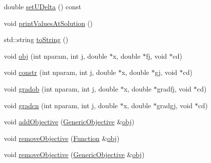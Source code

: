 \begin{DoxyCompactItemize}
double \hyperlink{classocra_1_1FSQPSolver_abcf60aed58c92261f4766a1718b9d10a}{set\+U\+Delta} () const 
\item 
void \hyperlink{classocra_1_1FSQPSolver_ad41514dc166b19fca4812b5521777f0a}{print\+Values\+At\+Solution} ()
\item 
std\+::string \hyperlink{classocra_1_1FSQPSolver_a3edc67c5c989d020ac8a77bf08946d14}{to\+String} ()
\item 
void \hyperlink{classocra_1_1FSQPSolver_a1275a02361629480cc18d44ce46d915c}{obj} (int nparam, int j, double $\ast$x, double $\ast$fj, void $\ast$cd)
\item 
void \hyperlink{classocra_1_1FSQPSolver_ae989c0c32f87ea5e4e5a85e11683fcff}{constr} (int nparam, int j, double $\ast$x, double $\ast$gj, void $\ast$cd)
\item 
void \hyperlink{classocra_1_1FSQPSolver_ac88cddc691c4bf9862f9d6f30599a098}{gradob} (int nparam, int j, double $\ast$x, double $\ast$gradfj, void $\ast$cd)
\item 
void \hyperlink{classocra_1_1FSQPSolver_aea97ea5c3c2480976ad27c190b60077d}{gradcn} (int nparam, int j, double $\ast$x, double $\ast$gradgj, void $\ast$cd)
\end{DoxyCompactItemize}
{\bf }\par
\begin{DoxyCompactItemize}
\item 
void \hyperlink{classocra_1_1FSQPSolver_a22838ed156e3b4742e2a72ff128b8a4b}{add\+Objective} (\hyperlink{namespaceocra_a37a91885f4fa5c523d22cb15d5673062}{Generic\+Objective} \&\hyperlink{classocra_1_1FSQPSolver_a1275a02361629480cc18d44ce46d915c}{obj})
\item 
void \hyperlink{classocra_1_1FSQPSolver_a4c49fc6031becd57ed9710ecb7f4d3f8}{remove\+Objective} (\hyperlink{classocra_1_1Function}{Function} \&\hyperlink{classocra_1_1FSQPSolver_a1275a02361629480cc18d44ce46d915c}{obj})
\item 
void \hyperlink{classocra_1_1FSQPSolver_aeb5031b31d2b3f9a303f234aa8418754}{remove\+Objective} (\hyperlink{namespaceocra_a37a91885f4fa5c523d22cb15d5673062}{Generic\+Objective} \&\hyperlink{classocra_1_1FSQPSolver_a1275a02361629480cc18d44ce46d915c}{obj})
\end{DoxyCompactItemize}

